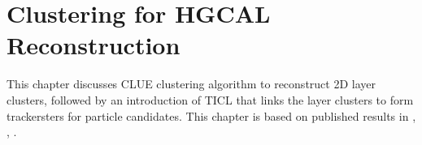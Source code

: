 \chapter{Clustering for HGCAL Reconstruction}
\label{sec:relatedworks}

This chapter discusses CLUE clustering algorithm to reconstruct 2D layer clusters, followed by an introduction of TICL that 
links the layer clusters to form trackersters for particle candidates. This chapter is based on published results in 
\cite{cluepaper}, \cite{Chen:2020mih}, \cite{DiPilato:2020mqs}.







% 



